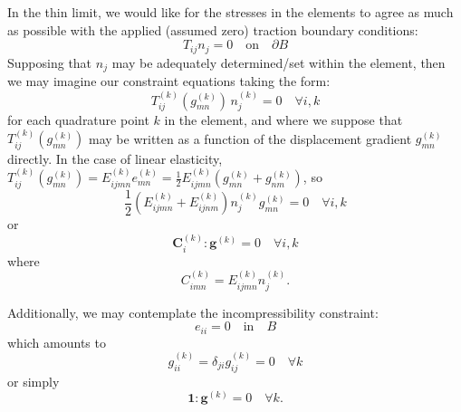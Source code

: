 \documentclass[12pt]{article}
\begin{document}
In the thin limit, we would like for the stresses in the elements to agree as much as possible with the applied (assumed zero) traction boundary conditions:
\begin{equation}
        T_{ij} n_j = 0 \quad \mbox{on} \quad \partial B
\end{equation}
Supposing that $n_j$ may be adequately determined/set within the element, then we may imagine our constraint equations taking the form:
\begin{equation}
        T^{(k)}_{ij} (g^{(k)}_{mn}) \, n^{(k)}_j = 0 \quad \forall i, k
\end{equation}
for each quadrature point $k$ in the element, and where we suppose that $T^{(k)}_{ij} (g^{(k)}_{mn})$ may be written as a function of the displacement gradient $g^{(k)}_{mn}$ directly. In the case of linear elasticity, $T^{(k)}_{ij} (g^{(k)}_{mn}) = E^{(k)}_{ijmn} e^{(k)}_{mn} = \frac{1}{2} E^{(k)}_{ijmn} (g^{(k)}_{mn} + g^{(k)}_{nm})$, so
\begin{equation}
        \frac{1}{2} (E^{(k)}_{ijmn} + E^{(k)}_{ijnm}) n^{(k)}_j g^{(k)}_{mn} = 0 \quad \forall i, k
\end{equation}
or
\begin{equation}
        \mathbf{C}^{(k)}_{i} \colon \mathbf{g}^{(k)} = 0 \quad \forall i, k
        \label{eq:constraintq4}
\end{equation}
where
\begin{equation}
        C^{(k)}_{imn} = E^{(k)}_{ijmn} n^{(k)}_j.
\end{equation}

Additionally, we may contemplate the incompressibility constraint:
\begin{equation}
        e_{ii} = 0 \quad \mbox{in} \quad B
\end{equation}
which amounts to
\begin{equation}
        g^{(k)}_{ii} = \delta_{ji} g^{(k)}_{ij} = 0 \quad \forall k
\end{equation}
or simply
\begin{equation}
        \mathbf{1} \colon \mathbf{g}^{(k)} = 0 \quad \forall k.
        \label{eq:incompq4}
\end{equation}
\end{document}
